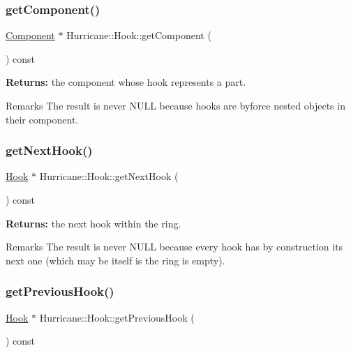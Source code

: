 \subsubsection{\texorpdfstring{get\+Component()}{getComponent()}}
{\footnotesize\ttfamily \mbox{\hyperlink{classHurricane_1_1Component}{Component}} $\ast$ Hurricane\+::\+Hook\+::get\+Component (\begin{DoxyParamCaption}{ }\end{DoxyParamCaption}) const\hspace{0.3cm}{\ttfamily [pure virtual]}}

{\bfseries Returns\+:} the component whose hook represents a part.

\begin{DoxyRemark}{Remarks}
The result is never N\+U\+LL because hooks are byforce nested objects in their component. 
\end{DoxyRemark}
\mbox{\label{classHurricane_1_1Hook_a03044fa995d6d784d6c441927ca8af04}} 
\subsubsection{\texorpdfstring{get\+Next\+Hook()}{getNextHook()}}
{\footnotesize\ttfamily \mbox{\hyperlink{classHurricane_1_1Hook}{Hook}} $\ast$ Hurricane\+::\+Hook\+::get\+Next\+Hook (\begin{DoxyParamCaption}{ }\end{DoxyParamCaption}) const}

{\bfseries Returns\+:} the next hook within the ring.

\begin{DoxyRemark}{Remarks}
The result is never N\+U\+LL because every hook has by construction its next one (which may be itself is the ring is empty). 
\end{DoxyRemark}
\mbox{\label{classHurricane_1_1Hook_ad69ebbbf3d64343aca23ca435f24c624}} 
\subsubsection{\texorpdfstring{get\+Previous\+Hook()}{getPreviousHook()}}
{\footnotesize\ttfamily \mbox{\hyperlink{classHurricane_1_1Hook}{Hook}} $\ast$ Hurricane\+::\+Hook\+::get\+Previous\+Hook (\begin{DoxyParamCaption}{ }\end{DoxyParamCaption}) const}

